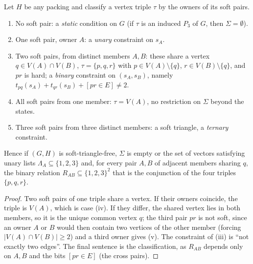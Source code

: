 \begin{lemma}\label{lem:sfstruct}
Let $H$ be any packing and classify a vertex triple $\tau$ by the owners of its soft pairs.
\begin{enumerate}
\item[(i)] No soft pair: a \emph{static} condition on $G$ (if $\tau$ is an induced $P_3$ of $G$, then $\Sigma=\emptyset$).
\item[(ii)] One soft pair, owner $A$: a \emph{unary} constraint on $s_A$.
\item[(iii)] Two soft pairs, from distinct members $A,B$: these share a vertex $q\in V(A)\cap V(B)$, $\tau=\{p,q,r\}$ with $p\in V(A)\setminus\{q\}$, $r\in V(B)\setminus\{q\}$, and $pr$ is hard; a \emph{binary} constraint on $(s_A,s_B)$, namely $t_{pq}(s_A)+t_{qr}(s_B)+[pr\in E]\ne2$.
\item[(iv)] All soft pairs from one member: $\tau=V(A)$, no restriction on $\Sigma$ beyond the states.
\item[(v)] Three soft pairs from three distinct members: a soft triangle, a \emph{ternary} constraint.
\end{enumerate}
Hence if $(G,H)$ is soft-triangle-free, $\Sigma$ is empty or the set of vectors satisfying unary lists $\Lambda_A\subseteq\{1,2,3\}$ and, for every pair $A,B$ of adjacent members sharing $q$, the binary relation $R_{AB}\subseteq\{1,2,3\}^2$ that is the conjunction of the four triples $\{p,q,r\}$.
\end{lemma}
\begin{proof}
Two soft pairs of one triple share a vertex. If their owners coincide, the triple is $V(A)$, which is case (iv). If they differ, the shared vertex lies in both members, so it is the unique common vertex $q$; the third pair $pr$ is not soft, since an owner $A$ or $B$ would then contain two vertices of the other member (forcing $|V(A)\cap V(B)|\ge2$) and a third owner gives (v). The constraint of (iii) is ``not exactly two edges''. The final sentence is the classification, as $R_{AB}$ depends only on $A,B$ and the bits $[pr\in E]$ (the cross pairs).
\end{proof}

